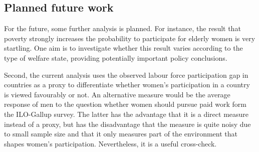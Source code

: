 \subsection{Planned future work}
For the future, some further analysis is planned. For instance, the result that poverty strongly increases the probability to participate for elderly women is very startling. One aim is to investigate whether this result varies according to the type of welfare state, providing potentially important policy conclusions.

Second, the current analysis uses the observed labour force participation gap in countries as a proxy to differentiate whether women's participation in a country is viewed favourably or not. An alternative measure would be the average response of men to the question whether women should pursue paid work form the ILO-Gallup survey. The latter has the advantage that it is a direct measure instead of a proxy, but has the disadvantage that the measure is quite noisy due to small sample size and that it only measures part of the environment that shapes women's participation. Nevertheless, it is a useful cross-check.
